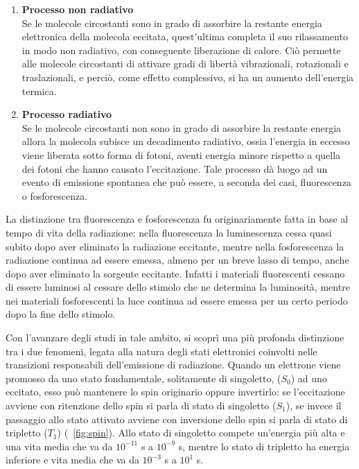 \begin{enumerate}
\item \textbf{Processo non radiativo}\\
Se le molecole circostanti sono in grado di assorbire la restante energia elettronica della molecola eccitata, quest'ultima completa il suo rilassamento in modo non radiativo, con conseguente liberazione di calore. 
Ciò permette alle molecole circostanti di attivare gradi di libertà vibrazionali, rotazionali e traslazionali, e perciò, come effetto complessivo, si ha un aumento dell'energia termica.

\item \textbf{Processo radiativo}\\
Se le molecole circostanti non sono in grado di assorbire la restante energia allora la molecola subisce un decadimento radiativo, ossia l'energia in eccesso viene liberata sotto forma di fotoni, aventi energia minore rispetto a quella dei fotoni che hanno causato l'eccitazione. 
Tale processo dà luogo ad un evento di emissione spontanea che può essere, a seconda dei casi, fluorescenza o fosforescenza.
\end{enumerate}

La distinzione tra fluorescenza e fosforescenza fu originariamente fatta in base al tempo di vita della radiazione: nella fluorescenza la luminescenza cessa quasi subito dopo aver eliminato la radiazione eccitante, mentre nella fosforescenza la radiazione continua ad essere emessa, almeno per un breve lasso di tempo, anche dopo aver eliminato la sorgente eccitante. 
Infatti i materiali fluorescenti cessano di essere luminosi al cessare dello stimolo che ne determina la luminosità, mentre nei materiali fosforescenti la luce continua ad essere emessa per un certo periodo dopo la fine dello stimolo.

Con l'avanzare degli studi in tale ambito, si scoprì una più profonda distinzione tra i due fenomeni, legata alla natura degli stati elettronici coinvolti nelle transizioni responsabili dell'emissione di radiazione.
Quando un elettrone viene promosso da uno stato fondamentale, solitamente di singoletto, ($S_0$) ad uno eccitato, esso può mantenere lo spin originario oppure invertirlo: se l'eccitazione avviene con ritenzione dello spin si parla di stato di singoletto ($S_1$), se invece il passaggio allo stato attivato avviene con inversione dello spin si parla di stato di tripletto ($T_1$) (\figurename~\ref{fig:spin}). 
Allo stato di singoletto compete un'energia più alta e una vita media che va da $10^{-11}$ s a $10^{-9}$ s, mentre lo stato di tripletto ha energia inferiore e vita media che va da $10^{-3}$ s a $10^{1}$ s.

